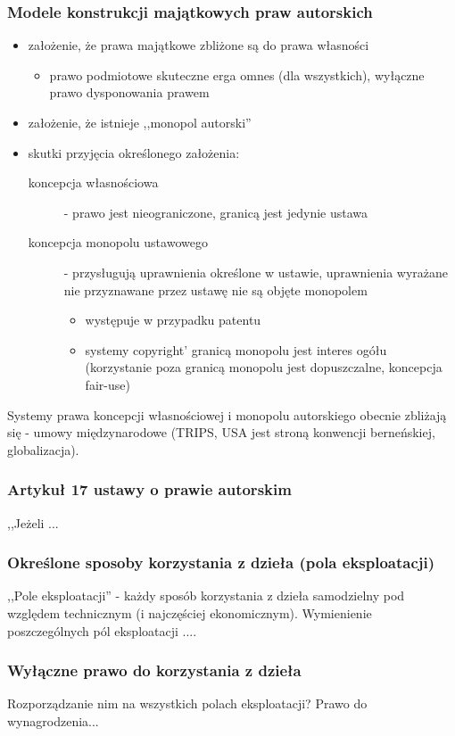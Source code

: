 \documentclass[12pt,a4paper]{article}
\begin{document}
\subsubsection{Modele konstrukcji majątkowych praw autorskich}
\begin{itemize}
\item założenie, że prawa majątkowe zbliżone są do prawa własności
	\begin{itemize}
		\item prawo podmiotowe skuteczne erga omnes (dla wszystkich), wyłączne prawo dysponowania prawem
	\end{itemize}
\item założenie, że istnieje ,,monopol autorski''
\item skutki przyjęcia określonego założenia:
	\begin{description}
		\item[koncepcja własnościowa] - prawo jest nieograniczone, granicą jest jedynie ustawa
		\item[koncepcja monopolu ustawowego] - przysługują uprawnienia określone w ustawie, uprawnienia wyrażane nie przyznawane przez ustawę nie są objęte monopolem
			\begin{itemize}
				\item występuje w przypadku patentu
				\item systemy copyright' granicą monopolu jest interes ogółu (korzystanie poza granicą monopolu jest dopuszczalne, koncepcja fair-use)
			\end{itemize}
	\end{description}
\end{itemize}
Systemy prawa koncepcji własnościowej i monopolu autorskiego obecnie zbliżają się - umowy międzynarodowe (TRIPS, USA jest stroną konwencji berneńskiej, globalizacja).

\subsubsection{Artykuł 17 ustawy o prawie autorskim} 
,,Jeżeli ...

\subsubsection{Określone sposoby korzystania z dzieła (pola eksploatacji)}
,,Pole eksploatacji'' - każdy sposób korzystania z dzieła samodzielny pod względem technicznym (i najczęściej ekonomicznym). Wymienienie poszczególnych pól eksploatacji ....

\subsubsection{Wyłączne prawo do korzystania z dzieła}
Rozporządzanie nim na wszystkich polach eksploatacji? Prawo do wynagrodzenia...
\end{document}
